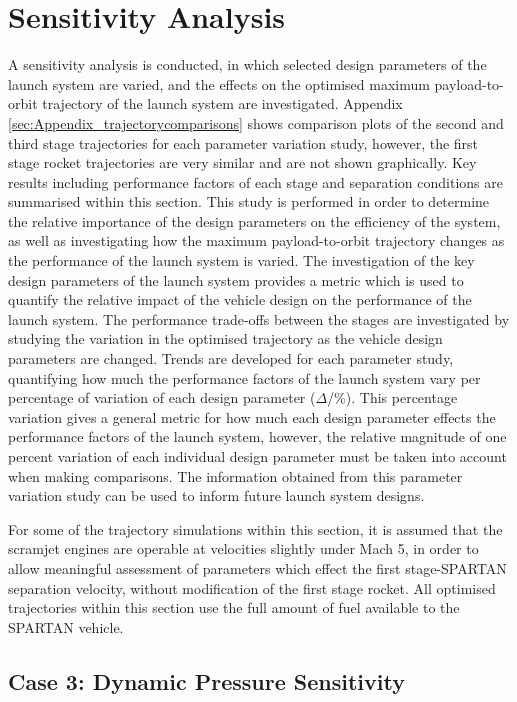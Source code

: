 \section{Sensitivity Analysis}\label{sec:sensitivityNoReturn}


A sensitivity analysis is conducted, in which selected design parameters of the launch system are varied, and the effects on the optimised maximum payload-to-orbit trajectory of the launch system are investigated. Appendix \ref{sec:Appendix_trajectorycomparisons} shows comparison plots of the second and third stage trajectories for each parameter variation study, however, the first stage rocket trajectories are very similar and are not shown graphically. Key results including performance factors of each stage and separation conditions are summarised within this section.
This study is performed in order to determine the relative importance of the design parameters on the efficiency of the system, as well as investigating how the maximum payload-to-orbit trajectory changes as the performance of the launch system is varied. The investigation of the key design parameters of the launch system provides a metric which is used to quantify the relative impact of the vehicle design on the performance of the launch system. The performance trade-offs between the stages are investigated by studying the variation in the optimised trajectory as the vehicle design parameters are changed. 
Trends are developed for each parameter study, quantifying how much the performance factors of the launch system vary per percentage of variation of each design parameter ($\Delta$/\%). This percentage variation gives a general metric for how much each design parameter effects the performance factors of the launch system, however, the relative magnitude of one percent variation of each individual design parameter must be taken into account when making comparisons. 
The information obtained from this parameter variation study can be used to inform future launch system designs. 

For some of the trajectory simulations within this section, it is assumed that the scramjet engines are operable at velocities slightly under Mach 5, in order to allow meaningful assessment of parameters which effect the first stage-SPARTAN separation velocity, without modification of the first stage rocket.
All optimised trajectories within this section use the full amount of fuel available to the SPARTAN vehicle. 



\subsection{Case 3: Dynamic Pressure Sensitivity}\label{sec:qvariation}

